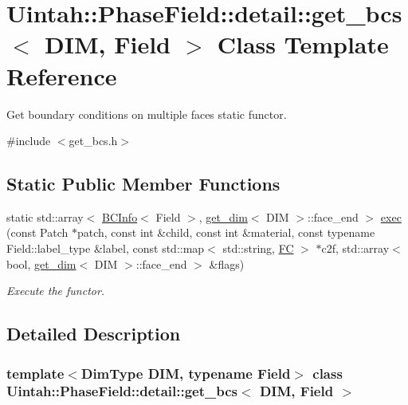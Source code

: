 \hypertarget{classUintah_1_1PhaseField_1_1detail_1_1get__bcs}{}\section{Uintah\+:\+:Phase\+Field\+:\+:detail\+:\+:get\+\_\+bcs$<$ D\+IM, Field $>$ Class Template Reference}
\label{classUintah_1_1PhaseField_1_1detail_1_1get__bcs}


Get boundary conditions on multiple faces static functor.  




{\ttfamily \#include $<$get\+\_\+bcs.\+h$>$}

\subsection*{Static Public Member Functions}
\begin{DoxyCompactItemize}
\item 
static std\+::array$<$ \hyperlink{structUintah_1_1PhaseField_1_1BCInfo}{B\+C\+Info}$<$ Field $>$, \hyperlink{structUintah_1_1PhaseField_1_1get__dim}{get\+\_\+dim}$<$ D\+IM $>$\+::face\+\_\+end $>$ \hyperlink{classUintah_1_1PhaseField_1_1detail_1_1get__bcs_aec2c358b09b48c57f06cc8ea48bd3205}{exec} (const Patch $\ast$patch, const int \&child, const int \&material, const typename Field\+::label\+\_\+type \&label, const std\+::map$<$ std\+::string, \hyperlink{namespaceUintah_1_1PhaseField_aeb51fe956fe07f1487f5878f4039f27c}{FC} $>$ $\ast$c2f, std\+::array$<$ bool, \hyperlink{structUintah_1_1PhaseField_1_1get__dim}{get\+\_\+dim}$<$ D\+IM $>$\+::face\+\_\+end $>$ \&flags)
\begin{DoxyCompactList}\small\item\em Execute the functor. \end{DoxyCompactList}\end{DoxyCompactItemize}


\subsection{Detailed Description}
\subsubsection*{template$<$Dim\+Type D\+IM, typename Field$>$\newline
class Uintah\+::\+Phase\+Field\+::detail\+::get\+\_\+bcs$<$ D\+I\+M, Field $>$}

